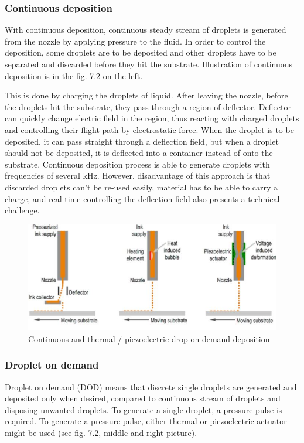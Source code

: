 \documentclass[a4paper, 11pt, reqno]{report}
\begin{document}
\subsubsection{Continuous deposition}
With continuous deposition, continuous steady stream of droplets is generated from the nozzle by applying pressure to the fluid. In order to control the deposition, some droplets are to be deposited and other droplets have to be separated and discarded before they hit the substrate. Illustration of continuous deposition is in the fig. 7.2 on the left.

	This is done by charging the droplets of liquid. After leaving the nozzle, before the droplets hit the substrate, they pass through a region of deflector. Deflector can quickly change electric field in the region, thus reacting with charged droplets and controlling their flight-path by electrostatic force. When the droplet is to be deposited, it can pass straight through a deflection field, but when a droplet should not be deposited, it is deflected into a container instead of onto the substrate. Continuous deposition process is able to generate droplets with frequencies of several kHz. However, disadvantage of this approach is that discarded droplets can't be re-used easily, material has to be able to carry a charge, and real-time controlling the deflection field also presents a technical challenge.

\begin{figure}[h!]
	\centering
	\includegraphics[scale=1]{ContinuousDOD}
	\caption{Continuous and thermal / piezoelectric drop-on-demand deposition \cite{InkjetPrinting}}
\end{figure}

\subsubsection{Droplet on demand}
Droplet on demand (DOD) means that discrete single droplets are generated and deposited only when desired, compared to continuous stream of droplets and disposing unwanted droplets. To generate a single droplet, a pressure pulse is required. To generate a pressure pulse, either thermal or piezoelectric actuator might be used (see fig. 7.2, middle and right picture).
\end{document}
